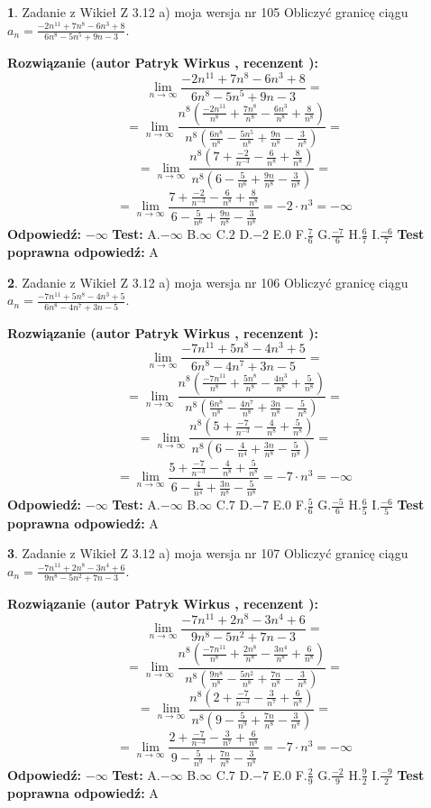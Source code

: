 \documentclass[12pt, a4paper]{article}
\theoremstyle{definition} %
\newtheorem{zad}{}
\newcommand{\zadStart}[1]{\begin{zad}#1\newline}
\newcommand{\zadStop}{\end{zad}}
\newcommand{\rozwStart}[2]{\noindent \textbf{Rozwiązanie (autor #1 , recenzent #2): }\newline}
\newcommand{\rozwStop}{\newline}
\newcommand{\odpStart}{\noindent \textbf{Odpowiedź:}\newline}
\newcommand{\odpStop}{\newline}
\newcommand{\testStart}{\noindent \textbf{Test:}\newline}
\newcommand{\testStop}{\newline}
\newcommand{\kluczStart}{\noindent \textbf{Test poprawna odpowiedź:}\newline}
\newcommand{\kluczStop}{\newline}
\begin{document}
\zadStart{Zadanie z Wikieł Z 3.12 a) moja wersja nr 105}
Obliczyć granicę ciągu $a_{n}=\frac{-2n^{11}+7n^{8}-6n^{3}+8}{6n^{8}-5n^{5}+9n-3}$.
\zadStop
\rozwStart{Patryk Wirkus}{}
$$\lim\limits_{n\to\infty}\frac{-2n^{11}+7n^{8}-6n^{3}+8}{6n^{8}-5n^{5}+9n-3}=$$
$$=\lim\limits_{n\to\infty}\frac{n^{8}\left(\frac{-2n^{11}}{n^{8}}+\frac{7n^{8}}{n^{8}}-\frac{6n^{3}}{n^{8}}+\frac{8}{n^{8}}\right)}{n^{8}\left(\frac{6n^{8}}{n^{8}}-\frac{5n^{5}}{n^{8}}+\frac{9n}{n^{8}}-\frac{3}{n^{8}}\right)}=$$
$$=\lim\limits_{n\to\infty}\frac{n^{8}\left(7+\frac{-2}{n^{-3}}-\frac{6}{n^{8}}+\frac{8}{n^{8}}\right)}
{n^{8}\left(6-\frac{5}{n^{6}}+\frac{9n}{n^{8}}-\frac{3}{n^{8}}\right)}=$$
$$=\lim\limits_{n\to\infty}\frac{7+\frac{-2}{n^{-3}}-\frac{6}{n^{8}}+\frac{8}{n^{8}}}{6-\frac{5}{n^{6}}+\frac{9n}{n^{8}}-\frac{3}{n^{8}}}=-2\cdot n^{3} = -\infty$$
\rozwStop
\odpStart
$-\infty$
\odpStop
\testStart
A.$-\infty$
B.$\infty$
C.$2$
D.$-2$
E.$0$
F.$\frac{7}{6}$
G.$\frac{-7}{6}$
H.$\frac{6}{7}$
I.$\frac{-6}{7}$
\testStop
\kluczStart
A
\kluczStop



\zadStart{Zadanie z Wikieł Z 3.12 a) moja wersja nr 106}
Obliczyć granicę ciągu $a_{n}=\frac{-7n^{11}+5n^{8}-4n^{3}+5}{6n^{8}-4n^{7}+3n-5}$.
\zadStop
\rozwStart{Patryk Wirkus}{}
$$\lim\limits_{n\to\infty}\frac{-7n^{11}+5n^{8}-4n^{3}+5}{6n^{8}-4n^{7}+3n-5}=$$
$$=\lim\limits_{n\to\infty}\frac{n^{8}\left(\frac{-7n^{11}}{n^{8}}+\frac{5n^{8}}{n^{8}}-\frac{4n^{3}}{n^{8}}+\frac{5}{n^{8}}\right)}{n^{8}\left(\frac{6n^{8}}{n^{8}}-\frac{4n^{7}}{n^{8}}+\frac{3n}{n^{8}}-\frac{5}{n^{8}}\right)}=$$
$$=\lim\limits_{n\to\infty}\frac{n^{8}\left(5+\frac{-7}{n^{-3}}-\frac{4}{n^{8}}+\frac{5}{n^{8}}\right)}
{n^{8}\left(6-\frac{4}{n^{4}}+\frac{3n}{n^{8}}-\frac{5}{n^{8}}\right)}=$$
$$=\lim\limits_{n\to\infty}\frac{5+\frac{-7}{n^{-3}}-\frac{4}{n^{8}}+\frac{5}{n^{8}}}{6-\frac{4}{n^{4}}+\frac{3n}{n^{8}}-\frac{5}{n^{8}}}=-7\cdot n^{3} = -\infty$$
\rozwStop
\odpStart
$-\infty$
\odpStop
\testStart
A.$-\infty$
B.$\infty$
C.$7$
D.$-7$
E.$0$
F.$\frac{5}{6}$
G.$\frac{-5}{6}$
H.$\frac{6}{5}$
I.$\frac{-6}{5}$
\testStop
\kluczStart
A
\kluczStop



\zadStart{Zadanie z Wikieł Z 3.12 a) moja wersja nr 107}
Obliczyć granicę ciągu $a_{n}=\frac{-7n^{11}+2n^{8}-3n^{4}+6}{9n^{8}-5n^{2}+7n-3}$.
\zadStop
\rozwStart{Patryk Wirkus}{}
$$\lim\limits_{n\to\infty}\frac{-7n^{11}+2n^{8}-3n^{4}+6}{9n^{8}-5n^{2}+7n-3}=$$
$$=\lim\limits_{n\to\infty}\frac{n^{8}\left(\frac{-7n^{11}}{n^{8}}+\frac{2n^{8}}{n^{8}}-\frac{3n^{4}}{n^{8}}+\frac{6}{n^{8}}\right)}{n^{8}\left(\frac{9n^{8}}{n^{8}}-\frac{5n^{2}}{n^{8}}+\frac{7n}{n^{8}}-\frac{3}{n^{8}}\right)}=$$
$$=\lim\limits_{n\to\infty}\frac{n^{8}\left(2+\frac{-7}{n^{-3}}-\frac{3}{n^{7}}+\frac{6}{n^{8}}\right)}
{n^{8}\left(9-\frac{5}{n^{9}}+\frac{7n}{n^{8}}-\frac{3}{n^{8}}\right)}=$$
$$=\lim\limits_{n\to\infty}\frac{2+\frac{-7}{n^{-3}}-\frac{3}{n^{7}}+\frac{6}{n^{8}}}{9-\frac{5}{n^{9}}+\frac{7n}{n^{8}}-\frac{3}{n^{8}}}=-7\cdot n^{3} = -\infty$$
\rozwStop
\odpStart
$-\infty$
\odpStop
\testStart
A.$-\infty$
B.$\infty$
C.$7$
D.$-7$
E.$0$
F.$\frac{2}{9}$
G.$\frac{-2}{9}$
H.$\frac{9}{2}$
I.$\frac{-9}{2}$
\testStop
\kluczStart
A
\kluczStop
\end{document}
